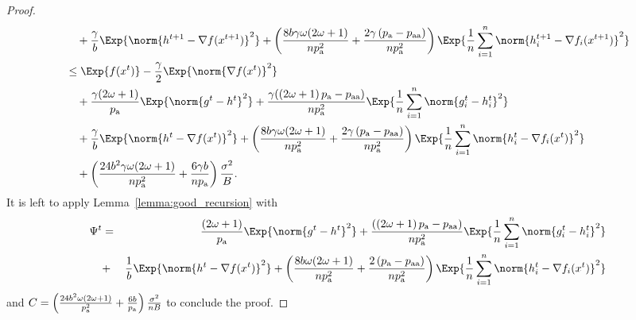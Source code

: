 \documentclass{article}
\newcommand*{\probavailable}{\ensuremath{p_{\textnormal{a}}}}
\newcommand*{\probpairaa}{\ensuremath{p_{\textnormal{aa}}}}
\begin{document}
\begin{proof}
\begin{align*}
      &\quad  + \frac{\gamma}{b} \Exp{\norm{h^{t+1} - \nabla f(x^{t+1})}^2} + \left(\frac{8 b \gamma \omega (2 \omega + 1)}{n \probavailable^2} + \frac{2 \gamma \left(\probavailable - \probpairaa\right)}{n \probavailable^2}\right) \Exp{\frac{1}{n}\sum_{i=1}^n\norm{h^{t+1}_i - \nabla f_i(x^{t+1})}^2}\\
      &\leq \Exp{f(x^t)} - \frac{\gamma}{2}\Exp{\norm{\nabla f(x^t)}^2} \\
      &\quad + \frac{\gamma (2 \omega + 1)}{\probavailable} \Exp{\norm{g^{t} - h^{t}}^2} + \frac{\gamma (\left(2 \omega + 1\right)\probavailable - \probpairaa)}{n \probavailable^2} \Exp{\frac{1}{n}\sum_{i=1}^n\norm{g^{t}_i - h^{t}_i}^2} \\
      &\quad + \frac{\gamma}{b} \Exp{\norm{h^{t} - \nabla f(x^{t})}^2} + \left(\frac{8 b \gamma \omega (2 \omega + 1)}{n \probavailable^2} + \frac{2 \gamma \left(\probavailable - \probpairaa\right)}{n \probavailable^2}\right)\Exp{\frac{1}{n}\sum_{i=1}^n\norm{h^{t}_i - \nabla f_i(x^{t})}^2} \\
      &\quad + \left(\frac{24 b^2 \gamma \omega (2 \omega + 1)}{n \probavailable^2} + \frac{6 \gamma b}{n \probavailable}\right) \frac{\sigma^2}{B}.
    \end{align*}
    It is left to apply Lemma~\ref{lemma:good_recursion} with 
    \begin{eqnarray*}
      \Psi^t &=& \frac{(2 \omega + 1)}{\probavailable} \Exp{\norm{g^{t} - h^{t}}^2} + \frac{(\left(2 \omega + 1\right)\probavailable - \probpairaa)}{n \probavailable^2} \Exp{\frac{1}{n}\sum_{i=1}^n\norm{g^{t}_i - h^{t}_i}^2} \\
      &+& \frac{1}{b} \Exp{\norm{h^{t} - \nabla f(x^{t})}^2} + \left(\frac{8 b \omega (2 \omega + 1)}{n \probavailable^2} + \frac{2 \left(\probavailable - \probpairaa\right)}{n \probavailable^2}\right)\Exp{\frac{1}{n}\sum_{i=1}^n\norm{h^{t}_i - \nabla f_i(x^{t})}^2}
    \end{eqnarray*}
    and $C = \left(\frac{24 b^2 \omega (2 \omega + 1)}{\probavailable^2} + \frac{6b}{\probavailable}\right) \frac{\sigma^2}{n B}$
    to conclude the proof.
  \end{proof}

  \COROLLARYSTOCHASTIC*
\end{document}
